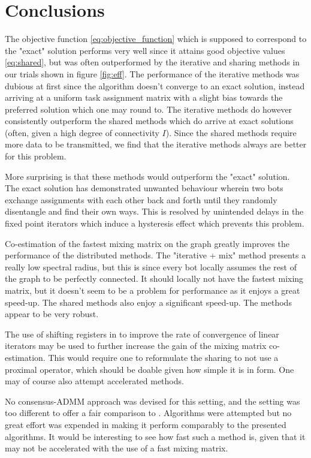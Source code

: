\documentclass{article}
\newcommand{\sectiontype}{}
\begin{document}
\section*{Conclusions}
\renewcommand{\sectiontype}{Conclusions}
The objective function \eqref{eq:objective_function} which is supposed to correspond to the "exact" solution performs very well since it attains good objective values \eqref{eq:shared}, but was often outperformed by the iterative and sharing methods in our trials shown in figure \ref{fig:eff}. The performance of the iterative methods was dubious at first since the algorithm doesn't converge to an exact solution, instead arriving at a uniform task assignment matrix with a slight bias towards the preferred solution which one may round to. The iterative methods do however consistently outperform the shared methods which do arrive at exact solutions (often, given a high degree of connectivity $I$). Since the shared methods require more data to be transmitted, we find that the iterative methods always are better for this problem.
\newline

More surprising is that these methods would outperform the "exact" solution. The exact solution has demonstrated unwanted behaviour wherein two bots exchange assignments with each other back and forth until they randomly disentangle and find their own ways. This is resolved by unintended delays in the fixed point iterators which induce a hysteresis effect which prevents this problem. \newline


Co-estimation of the fastest mixing matrix on the graph greatly improves the performance of the distributed methods. The "iterative + mix" method presents a really low spectral radius, but this is since every bot locally assumes the rest of the graph to be perfectly connected. It should locally not have the fastest mixing matrix, but it doesn't seem to be a problem for performance as it enjoys a great speed-up. The shared methods also enjoy a significant speed-up. The methods appear to be very robust. \newline


The use of shifting registers in \cite{johansson2008faster} to improve the rate of convergence of linear iterators may be used to further increase the gain of the mixing matrix co-estimation. This would require one to reformulate the sharing to not use a proximal operator, which should be doable given how simple it is in form. One may of course also attempt accelerated methods. \newline


No consensus-ADMM approach was devised for this setting, and the setting was too different to offer a fair comparison to \cite{shorinwa2023distributed}. Algorithms were attempted but no great effort was expended in making it perform comparably to the presented algorithms. It would be interesting to see how fast such a method is, given that it may not be accelerated with the use of a fast mixing matrix.

\clearpage

\printbibliography
\end{document}
